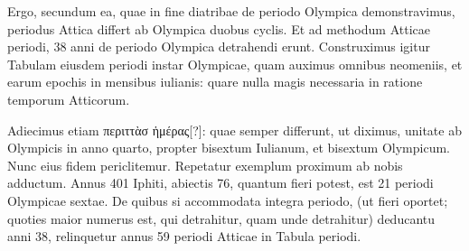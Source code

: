 Ergo, secundum ea, quae in fine diatribae de periodo
Olympica demonstravimus, periodus Attica differt ab Olympica
duobus cyclis.
Et ad methodum Atticae periodi, 38 anni de periodo
Olympica detrahendi erunt.
Construximus igitur Tabulam eiusdem
periodi instar Olympicae, quam auximus omnibus neomeniis,
et earum epochis in mensibus iulianis: quare nulla magis necessaria
in ratione temporum Atticorum.



Adiecimus etiam \textgreek{περιττὰσ ἡμέρας[?]}:
quae semper differunt, ut diximus, unitate ab Olympicis in anno quarto,
propter bisextum Iulianum, et bisextum Olympicum.
Nunc eius
fidem periclitemur.
Repetatur exemplum proximum ab nobis adductum.
Annus 401 Iphiti, abiectis 76, quantum fieri potest, est 21 periodi
Olympicae sextae.
De quibus si accommodata integra periodo,
(ut fieri oportet; quoties maior numerus est, qui detrahitur, quam unde
detrahitur) deducantu anni 38, relinquetur annus 59 periodi
Atticae in Tabula periodi.

